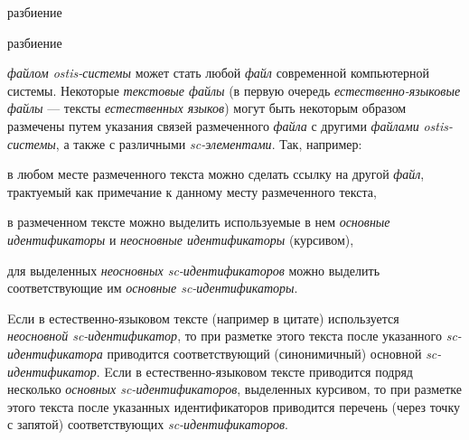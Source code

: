 \begin{SCn}

    \begin{scnrelfromset}{разбиение}
    \end{scnrelfromset}
    \begin{scnrelfromset}{разбиение}
            \begin{scnindent}
            \scnidtf{обозначение одного из вхождений (однорго из экземпляров) информационной конструкции]}
            \end{scnindent}
            \begin{scnindent}
            \end{scnindent}
    \end{scnrelfromset}

\end{SCn}

\textit{файлом ostis-системы} может стать любой \textit{файл} современной компьютерной системы.
Некоторые \textit{текстовые файлы} (в первую очередь \textit{естественно-языковые файлы} --- тексты \textit{естественных языков}) могут быть некоторым образом размечены путем указания связей размеченного \textit{файла} с другими \textit{файлами} \textit{ostis-системы}, а также с различными \textit{sc-элементами}.
Так, например:
\begin{textitemize}
    \item в любом месте размеченного текста можно сделать ссылку на другой \textit{файл}, трактуемый как примечание к данному месту размеченного текста,
    \item в размеченном тексте можно выделить используемые в нем \textit{основные идентификаторы} и \textit{неосновные идентификаторы} (курсивом),
    \item для выделенных \textit{неосновных sc-идентификаторов} можно выделить соответствующие им \textit{основные sc-идентификаторы}.
\end{textitemize}

Eсли в естественно-языковом тексте (например в цитате) используется \textit{неосновной sc-идентификатор}, то при разметке этого текста после указанного \textit{sc-идентификатора} приводится соответствующий (синонимичный) основной \textit{sc-идентификатор}.
Eсли в естественно-языковом тексте приводится подряд несколько \textit{основных sc-идентификаторов}, выделенных курсивом, то при разметке этого текста после указанных идентификаторов приводится перечень (через точку с запятой) соответствующих \textit{sc-идентификаторов}.

